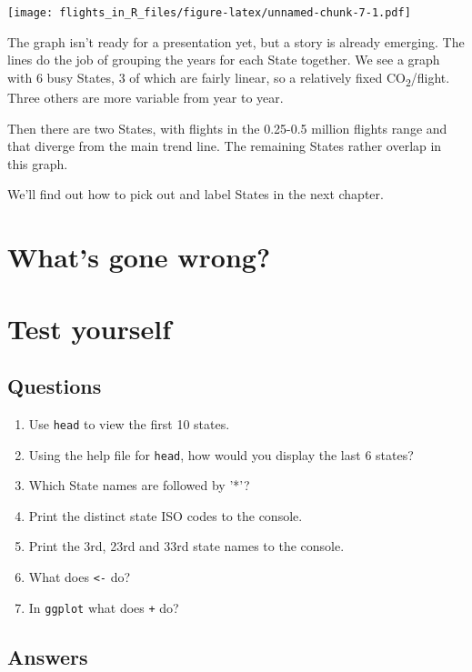 \documentclass[
]{book}
\providecommand{\tightlist}{%
  \setlength{\itemsep}{0pt}\setlength{\parskip}{0pt}}
\begin{document}
\texttt{[image: flights\_in\_R\_files/figure-latex/unnamed-chunk-7-1.pdf]}

The graph isn't ready for a presentation yet, but a story is already emerging. The lines do the job of grouping the years for each State together. We see a graph with 6 busy States, 3 of which are fairly linear, so a relatively fixed CO\textsubscript{2}/flight. Three others are more variable from year to year.

Then there are two States, with flights in the 0.25-0.5 million flights range and that diverge from the main trend line. The remaining States rather overlap in this graph.

We'll find out how to pick out and label States in the next chapter.

\hypertarget{whats-gone-wrong-2}{%
\section{What's gone wrong?}\label{whats-gone-wrong-2}}

\hypertarget{test-yourself-1}{%
\section{Test yourself}\label{test-yourself-1}}

\hypertarget{questions-1}{%
\subsection{Questions}\label{questions-1}}

\begin{enumerate}
\def\labelenumi{\arabic{enumi})}
\tightlist
\item
  Use \texttt{head} to view the first 10 states.
\item
  Using the help file for \texttt{head}, how would you display the last 6 states?
\item
  Which State names are followed by '*'?
\item
  Print the distinct state ISO codes to the console.
\item
  Print the 3rd, 23rd and 33rd state names to the console.
\item
  What does \texttt{\textless{}-} do?
\item
  In \texttt{ggplot} what does \texttt{+} do?
\end{enumerate}

\hypertarget{answers-1}{%
\subsection{Answers}\label{answers-1}}
\end{document}
